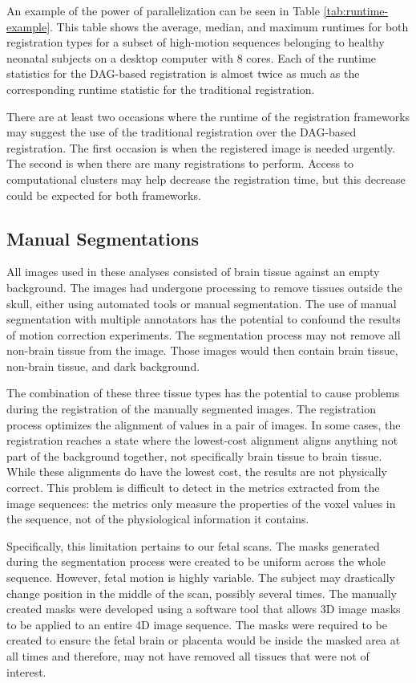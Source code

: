 An example of the power of parallelization can be seen in Table \ref{tab:runtime-example}. This table shows the average, median, and maximum runtimes for both registration types for a subset of high-motion sequences belonging to healthy neonatal subjects on a desktop computer with 8 cores. Each of the runtime statistics for the DAG-based registration is almost twice as much as the corresponding runtime statistic for the traditional registration.

There are at least two occasions where the runtime of the registration frameworks may suggest the use of the traditional registration over the DAG-based registration. The first occasion is when the registered image is needed urgently. The second is when there are many registrations to perform. Access to computational clusters may help decrease the registration time, but this decrease could be expected for both frameworks.

\subsection{Manual Segmentations}

All images used in these analyses consisted of brain tissue against an empty background. The images had undergone processing to remove tissues outside the skull, either using automated tools or manual segmentation. The use of manual segmentation with multiple annotators has the potential to confound the results of motion correction experiments. The segmentation process may not remove all non-brain tissue from the image. Those images would then contain brain tissue, non-brain tissue, and dark background. 

The combination of these three tissue types has the potential to cause problems during the registration of the manually segmented images. The registration process optimizes the alignment of values in a pair of images. In some cases, the registration reaches a state where the lowest-cost alignment aligns anything not part of the background together, not specifically brain tissue to brain tissue. While these alignments do have the lowest cost, the results are not physically correct. This problem is difficult to detect in the metrics extracted from the image sequences: the metrics only measure the properties of the voxel values in the sequence, not of the physiological information it contains. 

Specifically, this limitation pertains to our fetal scans. The masks generated during the segmentation process were created to be uniform across the whole sequence. However, fetal motion is highly variable. The subject may drastically change position in the middle of the scan, possibly several times. The manually created masks were developed using a software tool that allows 3D image masks to be applied to an entire 4D image sequence. The masks were required to be created to ensure the fetal brain or placenta would be inside the masked area at all times and therefore, may not have removed all tissues that were not of interest.

